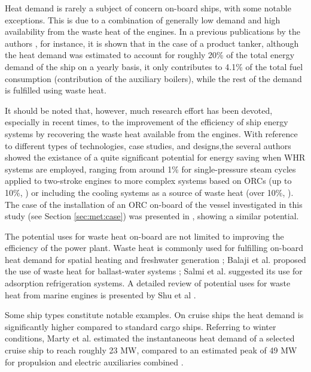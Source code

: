 \documentclass[preprint,12pt]{elsarticle}
\begin{document}
Heat demand is rarely a subject of concern on-board ships, with some notable exceptions. This is due to a combination of generally low demand and high availability from the waste heat of the engines. In a previous publications by the authors \cite{Baldi2015a}, for instance, it is shown that in the case of a product tanker, although the heat demand was estimated to account for roughly 20\% of the total energy demand of the ship on a yearly basis, it only contributes to 4.1\% of the total fuel consumption (contribution of the auxiliary boilers), while the rest of the demand is fulfilled using waste heat.

It should be noted that, however, much research effort has been devoted, especially in recent times, to the improvement of the efficiency of ship energy systems by recovering the waste heat available from the engines. With reference to different types of technologies, case studies, and designs,the several authors showed the existance of a quite significant potential for energy saving when WHR systems are employed, ranging from around 1\% for single-pressure steam cycles applied to two-stroke engines \cite{Theotokatos2012} to more complex systems based on ORCs (up to 10\%, \cite{Hountalas2012}) or including the cooling systems as a source of waste heat (over 10\%, \cite{Dimopoulos2012}).  The case of the installation of an ORC on-board of the vessel investigated in this study (see Section \ref{sec:met:case}) was presented in \cite{Mondejar2017}, showing a similar potential.


The potential uses for waste heat on-board are not limited to improving the efficiency of the power plant. Waste heat is commonly used for fulfilling on-board heat demand for spatial heating and freshwater generation \cite{Baldi2015a,Molland2011,Mccarthy1990};  Balaji et al. \cite{Balaji2012} proposed the use of waste heat for ballast-water systems ; Salmi et al. \cite{Salmi2017} suggested its use for adsorption refrigeration systems. A detailed review of potential uses for waste heat from marine engines is presented by Shu et al \cite{Shu2013}. 

Some ship types constitute notable examples. On cruise ships the heat demand is significantly higher compared to standard cargo ships. Referring to winter conditions, Marty et al. estimated the instantaneous heat demand of a selected cruise ship to reach roughly 23 MW, compared to an estimated peak of 49 MW for propulsion and electric auxiliaries combined \cite{Marty2012}.  
\end{document}
